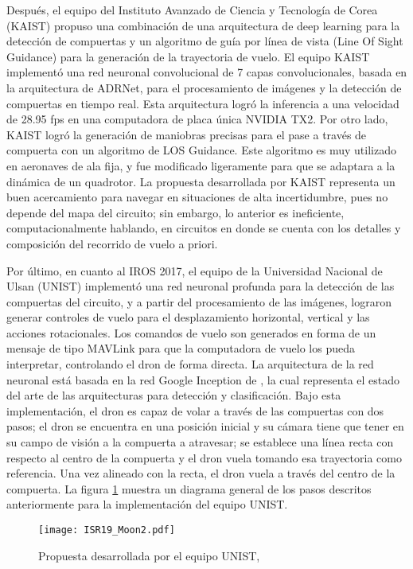 Después, el equipo del Instituto Avanzado de Ciencia y Tecnología de Corea (KAIST) propuso una combinación de una arquitectura de deep learning para la detección de compuertas y un algoritmo de guía por línea de vista (Line Of Sight Guidance) para la generación de la trayectoria de vuelo.
 El equipo KAIST implementó una red neuronal convolucional de 7 capas convolucionales, basada en la arquitectura de ADRNet, para el procesamiento de imágenes y la detección de compuertas en tiempo real. Esta arquitectura logró la inferencia a una velocidad de 28.95 fps en una computadora de placa única NVIDIA TX2. 
Por otro lado, KAIST logró la generación de maniobras precisas para el pase a través de compuerta con un algoritmo de LOS Guidance. Este algoritmo es muy utilizado en aeronaves de ala fija, y fue modificado ligeramente para que se adaptara a la dinámica de un quadrotor.
La propuesta desarrollada por KAIST representa un buen acercamiento para navegar en situaciones de alta incertidumbre, pues no depende del mapa del circuito; sin embargo, lo anterior es ineficiente, computacionalmente hablando, en circuitos en donde se cuenta con los detalles y composición del recorrido de vuelo a priori.

Por último, en cuanto al IROS 2017, el equipo de la Universidad Nacional de Ulsan (UNIST) implementó una red neuronal profunda para la detección de las compuertas del circuito, y a partir del procesamiento de las imágenes, lograron generar controles de vuelo para el desplazamiento horizontal, vertical y las acciones rotacionales. Los comandos de vuelo son generados en forma de un mensaje de tipo MAVLink para que la computadora de vuelo los pueda interpretar, controlando el dron de forma directa.
La arquitectura de la red neuronal está basada en la red Google Inception de \citet{xia2017inception}, la cual representa el estado del arte de las arquitecturas para detección y clasificación. 
Bajo esta implementación, el dron es capaz de volar a través de las compuertas con dos pasos; el dron se encuentra en una posición inicial y su cámara tiene que tener en su campo de visión a la compuerta a atravesar; se establece una línea recta con respecto al centro de la compuerta y el dron vuela tomando esa trayectoria como referencia. Una vez alineado con la recta, el dron vuela a través del centro de la compuerta. La figura \ref{fig:ISR19_Moon2} muestra un diagrama general de los pasos descritos anteriormente para la implementación del equipo UNIST.

\begin{figure}[ht]
    \centering
    \texttt{[image: ISR19\_Moon2.pdf]}
    \caption{Propuesta desarrollada por el equipo UNIST, \citet{moon2017iros}}
    \label{fig:ISR19_Moon2}
\end{figure}


